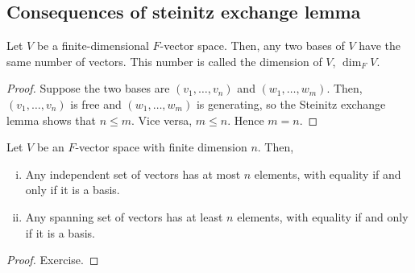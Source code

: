 \subsection{Consequences of steinitz exchange lemma}
\begin{corollary}
	Let \( V \) be a finite-dimensional \( F \)-vector space.
	Then, any two bases of \( V \) have the same number of vectors.
	This number is called the dimension of \( V \), \( \dim_F V \).
\end{corollary}
\begin{proof}
	Suppose the two bases are \( (v_1, \dots, v_n) \) and \( (w_1, \dots, w_m) \).
	Then, \( (v_1, \dots, v_n) \) is free and \( (w_1, \dots, w_m) \) is generating, so the Steinitz exchange lemma shows that \( n \leq m \).
	Vice versa, \( m \leq n \).
	Hence \( m = n \).
\end{proof}
\begin{corollary}
	Let \( V \) be an \( F \)-vector space with finite dimension \( n \).
	Then,
	\begin{enumerate}[(i)]
		\item Any independent set of vectors has at most \( n \) elements, with equality if and only if it is a basis.
		\item Any spanning set of vectors has at least \( n \) elements, with equality if and only if it is a basis.
	\end{enumerate}
\end{corollary}
\begin{proof}
	Exercise.
\end{proof}

